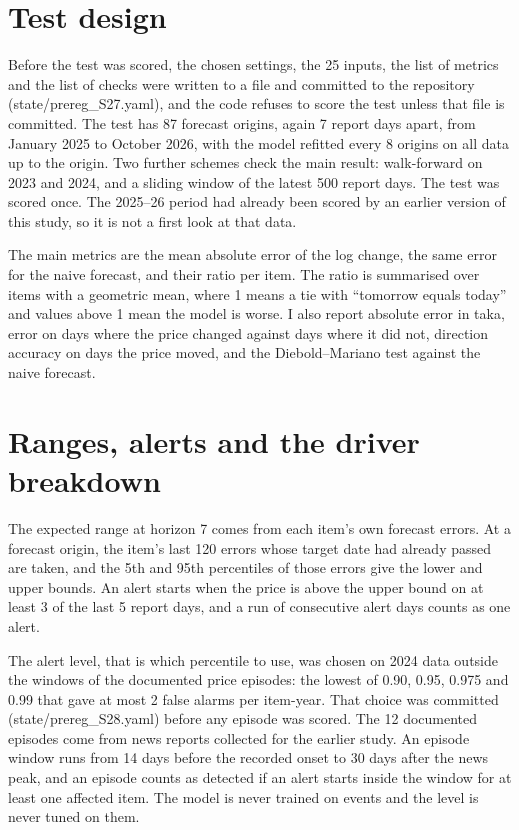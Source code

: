 \documentclass[12pt]{report}
\begin{document}
\section{Test design}
Before the test was scored, the chosen settings, the 25 inputs, the list of metrics and the list of checks were written to a file and committed to the repository (state/prereg\_S27.yaml), and the code refuses to score the test unless that file is committed. The test has 87 forecast origins, again 7 report days apart, from January 2025 to October 2026, with the model refitted every 8 origins on all data up to the origin. Two further schemes check the main result: walk-forward on 2023 and 2024, and a sliding window of the latest 500 report days. The test was scored once. The 2025--26 period had already been scored by an earlier version of this study, so it is not a first look at that data.

The main metrics are the mean absolute error of the log change, the same error for the naive forecast, and their ratio per item. The ratio is summarised over items with a geometric mean, where 1 means a tie with ``tomorrow equals today'' and values above 1 mean the model is worse. I also report absolute error in taka, error on days where the price changed against days where it did not, direction accuracy on days the price moved, and the Diebold--Mariano test against the naive forecast.

\section{Ranges, alerts and the driver breakdown}
The expected range at horizon 7 comes from each item's own forecast errors. At a forecast origin, the item's last 120 errors whose target date had already passed are taken, and the 5th and 95th percentiles of those errors give the lower and upper bounds. An alert starts when the price is above the upper bound on at least 3 of the last 5 report days, and a run of consecutive alert days counts as one alert.

The alert level, that is which percentile to use, was chosen on 2024 data outside the windows of the documented price episodes: the lowest of 0.90, 0.95, 0.975 and 0.99 that gave at most 2 false alarms per item-year. That choice was committed (state/prereg\_S28.yaml) before any episode was scored. The 12 documented episodes come from news reports collected for the earlier study. An episode window runs from 14 days before the recorded onset to 30 days after the news peak, and an episode counts as detected if an alert starts inside the window for at least one affected item. The model is never trained on events and the level is never tuned on them.
\end{document}
